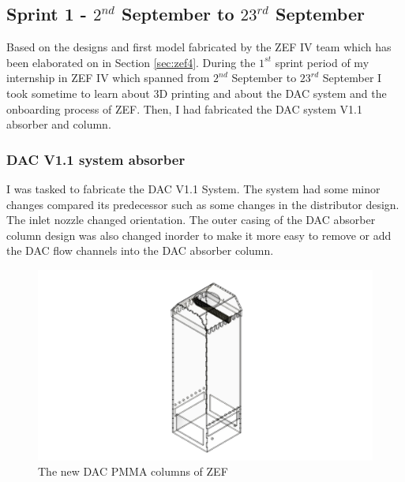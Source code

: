 \subsection{Sprint 1 - $2^{nd}$ September to $23^{rd}$ September}
\label{sec:sprint1}

Based on the designs and first model fabricated by the ZEF IV team which has been elaborated on in Section \ref{sec:zef4}. During the $1^{st}$ sprint period of my internship in ZEF IV which spanned from $2^{nd}$ September to $23^{rd}$ September I took sometime to learn about 3D printing and about the DAC system and the onboarding process of ZEF. Then, I had fabricated the DAC system V1.1 absorber and column.  

\subsubsection{DAC V1.1 system absorber}


I was tasked to fabricate the DAC V1.1 System. The system had some minor changes compared its predecessor such as some changes in the distributor design. The inlet nozzle changed orientation. The outer casing of the DAC absorber column design was also changed inorder to make it more easy to remove or add the DAC flow channels into the DAC absorber column. 
\bigbreak

\begin{figure}[H]
    \centering
    \includegraphics[scale = 0.4]{images/mywork/Sprint1/Column.png}
    \caption{The new DAC PMMA columns of ZEF}
    \label{fig:daccolumn}
\end{figure}


